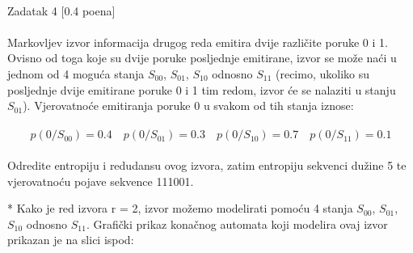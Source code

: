 \documentclass[12pt]{article}
\begin{document}
\begin{enumerate}
		\\
Zadatak 4 [0.4 poena] \\
\\
Markovljev izvor informacija drugog reda emitira dvije različite poruke 0 i 1. Ovisno od toga koje su dvije poruke posljednje emitirane, izvor se može naći u jednom od 4 moguća stanja $S_{00}$, $S_{01}$, $S_{10}$ odnosno $S_{11}$ (recimo, ukoliko su posljednje dvije emitirane poruke 0 i 1 tim redom, izvor će se nalaziti u stanju $S_{01}$). Vjerovatnoće emitiranja poruke 0 u svakom od tih stanja iznose: \\
\\
\begin{equation*}
    p(0/S_{00}) = 0.4 \quad p(0/S_{01}) = 0.3 \quad p(0/S_{10}) = 0.7 \quad p(0/S_{11}) = 0.1 
\end{equation*}
\\
Odredite entropiju i redudansu ovog izvora, zatim entropiju sekvenci dužine 5 te vjerovatnoću pojave sekvence 111001.

		* Kako je red izvora r = 2, izvor možemo modelirati pomoću 4 stanja $S_{00}$,
$S_{01}$, $S_{10}$ odnosno $S_{11}$. Grafički prikaz konačnog automata koji modelira ovaj
izvor prikazan je na slici ispod: \\
\\
\end{enumerate}
\end{document}
